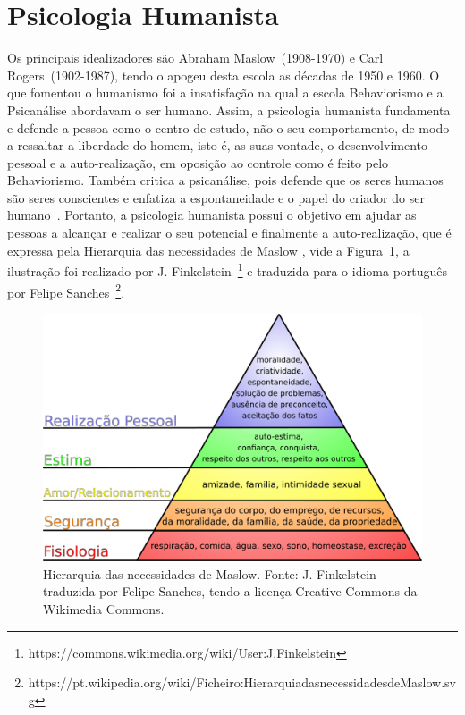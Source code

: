 \section{Psicologia Humanista}\label{humanismo}

Os principais idealizadores são Abraham Maslow~(1908-1970) e Carl Rogers~(1902-1987), tendo o apogeu desta escola as décadas de 1950 e 1960. 
O que fomentou o humanismo foi a insatisfação na qual a escola Behaviorismo e a Psicanálise abordavam o ser humano. 
Assim, a psicologia humanista fundamenta e defende a pessoa como o centro de estudo, não o seu comportamento, de modo a ressaltar a liberdade do homem, isto é, as suas vontade, o desenvolvimento pessoal e a auto-realização, em oposição ao controle como é feito pelo Behaviorismo.
Também critica a psicanálise, pois defende que os seres humanos são seres conscientes e enfatiza a espontaneidade e o papel do criador do ser humano~\cite{silva2007psicologia_educacao}.
Portanto, a psicologia humanista possui o objetivo em ajudar as pessoas a alcançar e realizar o seu potencial e finalmente a auto-realização, que é expressa pela Hierarquia das necessidades de Maslow \cite{laruse2009geral,rogers2017pessoa}, vide a Figura~\ref{img:triangulo-maslow}, a ilustração foi realizado por J. Finkelstein~\footnote{https://commons.wikimedia.org/wiki/User:J.\underline{\hspace{.1cm}}Finkelstein} e traduzida para o idioma português por Felipe Sanches~\footnote{https://pt.wikipedia.org/wiki/Ficheiro:Hierarquia\underline{\hspace{.1cm}}das\underline{\hspace{.1cm}}necessidades\underline{\hspace{.1cm}}de\underline{\hspace{.1cm}}Maslow.svg}.


\begin{figure}[!htp]
    \centering
    \includegraphics[scale=.32]{../../../img/psicologia/triangulo-maslow.pdf}
    \caption{
                Hierarquia das necessidades de Maslow. 
                Fonte: J. Finkelstein traduzida por Felipe Sanches, tendo a licença Creative Commons da Wikimedia Commons.
            }
    \label{img:triangulo-maslow}
\end{figure}


